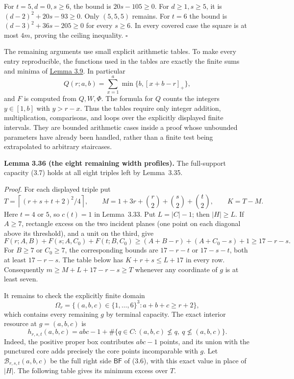 \documentclass[11pt]{article}
\begin{document}
For \(t=5,d=0,s\ge6\), the bound is \(20s-105\ge0\). For \(d\ge1,s\ge5\), it is \((d-2)^2+20s-93\ge0\). Only \((5,5,5)\) remains. For \(t=6\) the bound is \((d-3)^2+36s-205\ge0\) for every \(s\ge6\). In every covered case the square is at most \(4m\), proving the ceiling inequality. \ensuremath{\square}

The remaining arguments use small explicit arithmetic tables. To make every entry reproducible, the functions used in the tables are exactly the finite sums and minima of \hyperref[res:A.8]{Lemma 3.9}. In particular
\[
Q(r;a,b)=\sum_{x=1}^{a}\min\{b,[x+b-r]_+\},
\]
and \(F\) is computed from \(Q,W,\Phi\). The formula for \(Q\) counts the integers \(y\in[1,b]\) with \(y>r-x\). Thus the tables require only integer addition, multiplication, comparisons, and loops over the explicitly displayed finite intervals. They are bounded arithmetic cases inside a proof whose unbounded parameters have already been handled, rather than a finite test being extrapolated to arbitrary staircases.

\label{res:A.33}\label{res:A.34}
\textbf{Lemma 3.36 (the eight remaining width profiles).}
The full-support capacity (3.7) holds at all eight triples left by
Lemma~3.35.

\emph{Proof.}
For each displayed triple put
\[
 T=\left\lceil(r+s+t+2)^2/4\right\rceil,\qquad
 M=1+3r+\binom r2+\binom s2+\binom t2,\qquad K=T-M.
\]
Here $t=4$ or $5$, so $c(t)=1$ in Lemma~3.33.  Put $L=|C|-1$;
then $|H|\ge L$.
If $A\ge7$, rectangle excess on the two incident planes (one point
on each diagonal above its threshold), and a unit on the third, give
\[
 F(r;A,B)+F(s;A,C_0)+F(t;B,C_0)
 \ge(A+B-r)+(A+C_0-s)+1\ge17-r-s.
\]
For $B\ge7$ or $C_0\ge7$, the corresponding bounds are
$17-r-t$ or $17-s-t$, both at least $17-r-s$.
The table below has $K+r+s\le L+17$ in every row.
Consequently $m\ge M+L+17-r-s\ge T$ whenever any coordinate of $g$
is at least seven.

It remains to check the explicitly finite domain
\[
 \Omega_r=\{(a,b,c)\in\{1,\ldots,6\}^3:a+b+c\ge r+2\},
\]
which contains every remaining $g$ by terminal capacity.
The exact interior resource at $g=(a,b,c)$ is
\[
 h_{r,s,t}(a,b,c)
 =abc-1+\#\{q\in C:(a,b,c)\nleq q,\ q\nleq(a,b,c)\}.
\]
Indeed, the positive proper box contributes $abc-1$ points, and its
union with the punctured core adds precisely the core points
incomparable with $g$.  Let $\mathcal B_{r,s,t}(a,b,c)$ be the full
right side $\mathsf{BF}$ of (3.6), with this exact value in place of
$|H|$.  The following table gives its minimum excess over $T$.
\end{document}
